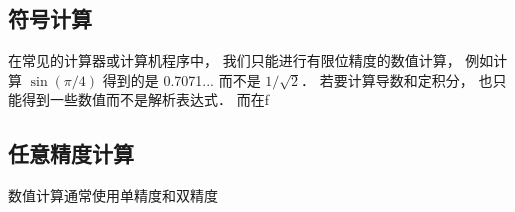 
\subsection{符号计算}
在常见的计算器或计算机程序中， 我们只能进行有限位精度的数值计算， 例如计算 $\sin(\pi/4)$ 得到的是 0.7071... 而不是 $1/\sqrt{2}$． 若要计算导数和定积分， 也只能得到一些数值而不是解析表达式． 而在f

\subsection{任意精度计算}
数值计算通常使用单精度和双精度

